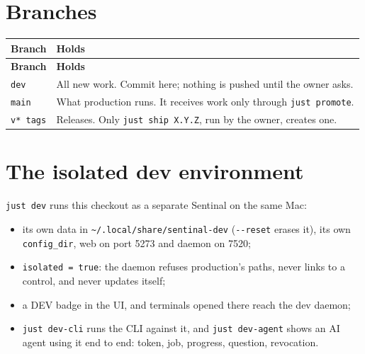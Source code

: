 \section{Branches}

\begin{small}
\begin{longtable}{>{\raggedright\arraybackslash}p{0.18\dimexpr \linewidth-4\tabcolsep\relax}>{\raggedright\arraybackslash}p{0.82\dimexpr \linewidth-4\tabcolsep\relax}}
\toprule
\textbf{Branch} & \textbf{Holds} \\
\midrule
\endfirsthead
\toprule
\textbf{Branch} & \textbf{Holds} \\
\midrule
\endhead
\texttt{dev} & All new work. Commit here; nothing is pushed until the owner asks. \\
\texttt{main} & What production runs. It receives work only through \texttt{just\ promote}. \\
\texttt{v*\ tags} & Releases. Only \texttt{just\ ship\ X.\allowbreak{}Y.\allowbreak{}Z}, run by the owner, creates one. \\
\bottomrule
\end{longtable}
\end{small}

\section{The isolated dev environment}

\texttt{just\ dev} runs this checkout as a separate Sentinal on the same Mac:

\begin{itemize}
\item its own data in \texttt{\textasciitilde{}/\allowbreak{}.\allowbreak{}local/\allowbreak{}share/\allowbreak{}sentinal-{}\allowbreak{}dev} (\texttt{-{}\allowbreak{}-{}\allowbreak{}reset} erases it), its own \texttt{config\_\allowbreak{}dir}, web on port 5273 and daemon on 7520;
\item \texttt{isolated\ =\ true}: the daemon refuses production's paths, never links to a control, and never updates itself;
\item a DEV badge in the UI, and terminals opened there reach the dev daemon;
\item \texttt{just\ dev-{}\allowbreak{}cli} runs the CLI against it, and \texttt{just\ dev-{}\allowbreak{}agent} shows an AI agent using it end to end: token, job, progress, question, revocation.
\end{itemize}

